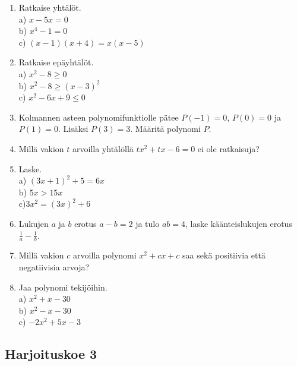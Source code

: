 \begin{enumerate}
\item Ratkaise yhtälöt.\\ a) $x-5x=0$\\ b) $x^4-1=0$\\ c) $(x-1)(x+4) = x(x-5)$
\item Ratkaise epäyhtälöt.\\ a) $x^2-8\geq0$\\ b) $x^2-8\geq(x-3)^2$\\ c) $x^2-6x+9\leq0$
\item Kolmannen asteen polynomifunktiolle pätee $P(-1)=0$, $P(0)=0$ ja $P(1)=0$. Lisäksi $P(3)=3$. Määritä polynomi $P$. %
\item Millä vakion $t$ arvoilla yhtälöllä $tx^2+tx-6=0$ ei ole ratkaisuja?
\item Laske. \\ a) $(3x+1)^2+5=6x$\\ b) $5x>15x$\\ c)$3x^2=(3x)^2+6$ 
\item Lukujen $a$ ja $b$ erotus $a-b=2$ ja tulo $ab=4$, laske käänteislukujen erotus $\frac{1}{a}-\frac{1}{b}$.
\item Millä vakion $c$ arvoilla polynomi $x^2+cx+c$ saa sekä positiivia että negatiivisia arvoja?
\item Jaa polynomi tekijöihin.\\ a) $x^2+x-30$\\ b)  $x^2-x-30$\\ c)  $-2x^2+5x-3$ 

\end{enumerate}


\subsection*{Harjoituskoe 3}

